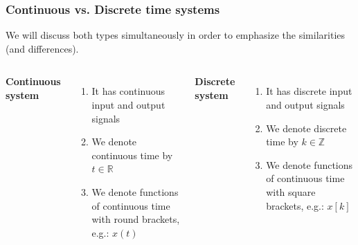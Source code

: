 \documentclass{beamer}
\begin{document}
	\begin{frame}
		\frametitle{Continuous vs. Discrete time systems}
		\vspace{-2ex}
		We will discuss both types simultaneously in order to emphasize the similarities (and differences).\\
		\medskip
		\begin{columns}[c] 
			
			\center \textbf{Continuous system}
			\begin{enumerate}
				\item It has continuous input and output signals
				\item We denote continuous time by $t \in \mathds{R}$
				\item We denote functions of continuous time with round brackets, e.g.: $x(t)$
			\end{enumerate}
			
			\center \textbf{Discrete system}
			\begin{enumerate}
				\item It has discrete input and output signals
				\item We denote discrete time by $k \in \mathds{Z}$
				\item We denote functions of continuous time with square brackets, e.g.: $x[k]$
			\end{enumerate}
			
		\end{columns}
	\end{frame}
	
	
\end{document}
